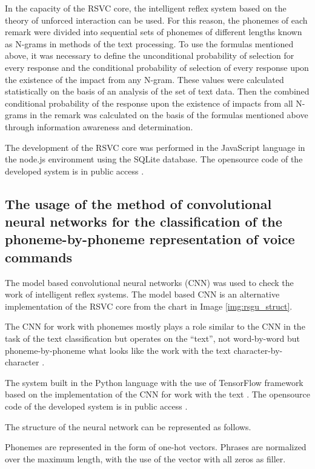 In the capacity of the RSVC core, the intelligent reflex system based on the theory of unforced interaction can be used. For this reason, the phonemes of each remark were divided into sequential sets of phonemes of different lengths known as N-grams in methods of the text processing. To use the formulas mentioned above, it was necessary to define the unconditional probability of selection for every response and the conditional probability of selection of every response upon the existence of the impact from any N-gram. These values were calculated statistically on the basis of an analysis of the set of text data. Then the combined conditional probability of the response upon the existence of impacts from all N-grams in the remark was calculated on the basis of the formulas mentioned above through information awareness and determination. 

The development of the RSVC core was performed in the JavaScript language in the node.js environment using the SQLite database. The opensource code of the developed system is in public access \cite{code1}. 

\subsection{The usage of the method of convolutional neural networks for the classification of the phoneme-by-phoneme representation of voice commands} 

The model based convolutional neural networks (CNN) was used to check the work of intelligent reflex systems. The model based CNN is an alternative implementation of the RSVC core from the chart in Image \ref{img:rsgu_struct}. 

The CNN for work with phonemes mostly plays a role similar to the CNN in the task of the text classification \cite{Kim_2014} but operates on the “text”, not word-by-word but phoneme-by-phoneme what looks like the work with the text character-by-character \cite{Zhang_2016}. 

The system built in the Python language with the use of TensorFlow framework based on the implementation of the CNN for work with the text \cite{Britz_2015}. The opensource code of the developed system is in public access \cite{code2}. 

The structure of the neural network can be represented as follows. 

Phonemes are represented in the form of one-hot vectors. Phrases are normalized over the maximum length, with the use of the vector with all zeros as filler.

